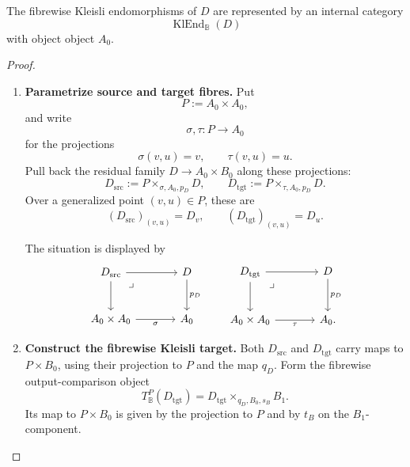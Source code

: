 \begin{theorem}
\label{thm:syn-to-kleisli-endomorphism-category-exists}
    The fibrewise Kleisli endomorphisms of \(D\) are represented by an internal
    category
    \[
        \operatorname{KlEnd}_{\mathbb B}(D)
    \]
    with object object \(A_0\).
\end{theorem}

\begin{proof}
    \leavevmode
    \begin{enumerate}
        \item \textbf{Parametrize source and target fibres.}
        Put
        \[
            P:=A_0\times A_0,
        \]
        and write
        \[
            \sigma,\tau:P\to A_0
        \]
        for the projections
        \[
            \sigma(v,u)=v,
            \qquad
            \tau(v,u)=u.
        \]
        Pull back the residual family \(D\to A_0\times B_0\) along these
        projections:
        \[
            D_{\mathrm{src}}:=P\times_{\sigma,A_0,p_D}D,
            \qquad
            D_{\mathrm{tgt}}:=P\times_{\tau,A_0,p_D}D.
        \]
        Over a generalized point \((v,u)\in P\), these are
        \[
            (D_{\mathrm{src}})_{(v,u)}=D_v,
            \qquad
            (D_{\mathrm{tgt}})_{(v,u)}=D_u.
        \]

        The situation is displayed by
        \[
        \begin{tikzcd}[column sep=large, row sep=large]
            D_{\mathrm{src}}
                \arrow[r]
                \arrow[d]
                \arrow[dr, phantom, "\lrcorner", very near start]
            &
            D
                \arrow[d, "p_D"]
            \\
            A_0\times A_0
                \arrow[r, "\sigma"']
            &
            A_0
        \end{tikzcd}
        \qquad
        \begin{tikzcd}[column sep=large, row sep=large]
            D_{\mathrm{tgt}}
                \arrow[r]
                \arrow[d]
                \arrow[dr, phantom, "\lrcorner", very near start]
            &
            D
                \arrow[d, "p_D"]
            \\
            A_0\times A_0
                \arrow[r, "\tau"']
            &
            A_0 .
        \end{tikzcd}
        \]

        \item \textbf{Construct the fibrewise Kleisli target.}
        Both \(D_{\mathrm{src}}\) and \(D_{\mathrm{tgt}}\) carry maps to
        \(P\times B_0\), using their projection to \(P\) and the map \(q_D\).
        Form the fibrewise output-comparison object
        \[
            T_{\mathbb B}^{P}(D_{\mathrm{tgt}})
            =
            D_{\mathrm{tgt}}
            \times_{q_D,B_0,s_B}
            B_1.
        \]
        Its map to \(P\times B_0\) is given by the projection to \(P\) and by
        \(t_B\) on the \(B_1\)-component.


\end{enumerate}
\end{proof}
